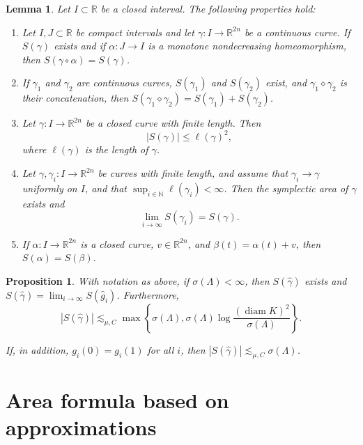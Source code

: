 \documentclass[10pt,a4paper]{amsart}
\newtheorem{lemma}{Lemma}
\newtheorem{prop}{Proposition}
\newcommand{\R}{\mathbb{R}}
\DeclareMathOperator{\diam}{diam}
\newcommand{\from}{\colon}
\begin{document}
\begin{lemma}\label{lem:symplectic-area-props-v2}   Let $I\subset \R$ be a closed interval. The following properties hold:
  \begin{enumerate}
  \item Let $I,J\subset \R$ be compact intervals and let $\gamma\from I\to\mathbb R^{2n}$ be a continuous curve. If $S(\gamma)$ exists and if $\alpha\from J\to I$ is a monotone nondecreasing homeomorphism, then $S(\gamma\circ \alpha) = S(\gamma)$.
  \item If $\gamma_1$ and $\gamma_2$ are continuous curves, $S(\gamma_1)$ and $S(\gamma_2)$ exist, and $\gamma_1\diamond \gamma_2$ is their concatenation, then $S(\gamma_1\diamond \gamma_2) = S(\gamma_1)+S(\gamma_2)$.
  \item Let $\gamma\from I\to\mathbb R^{2n}$ be a closed curve with finite length. Then 
  \[
  |S(\gamma)|\le \ell(\gamma)^2,
  \]
  where $\ell(\gamma)$ is the length of $\gamma$.
  \item Let $\gamma,\gamma_i\from I\to\mathbb R^{2n}$ be curves with finite length, and assume that $\gamma_i\to\gamma$ uniformly on $I$, and that $\sup_{i\in\mathbb N}\ell(\gamma_i)<\infty$. Then the symplectic area of $\gamma$ exists and
  \[
  \lim_{i\to\infty}S(\gamma_i)=S(\gamma).
  \]
\item If $\alpha\from I\to \R^{2n}$ is a closed curve, $v\in \R^{2n}$, and $\beta(t) = \alpha(t) + v$, then $S(\alpha) = S(\beta)$.
  \end{enumerate}
\end{lemma}

\begin{prop}\label{prop:vertical-curve-area}
  With notation as above, if $\sigma(\Lambda)<\infty$, then
  $S(\hat{\gamma})$ exists and 
  $S(\hat{\gamma}) = \lim_{i\to \infty} S(\hat{g}_i)$. Furthermore, 
  \begin{equation}\label{eq:sgamma-bound}
    |S(\hat{\gamma})| \lesssim_{\mu,C} \max\left\{\sigma(\Lambda), \sigma(\Lambda) \log \frac{(\diam K)^2}{\sigma(\Lambda)}\right\}.
  \end{equation}
  
  If, in addition, $g_i(0)=g_i(1)$ for all $i$, then $|S(\hat{\gamma})| \lesssim_{\mu,C} \sigma(\Lambda)$.
\end{prop}

\section{Area formula based on approximations}\label{sec:area-formula}
\end{document}
